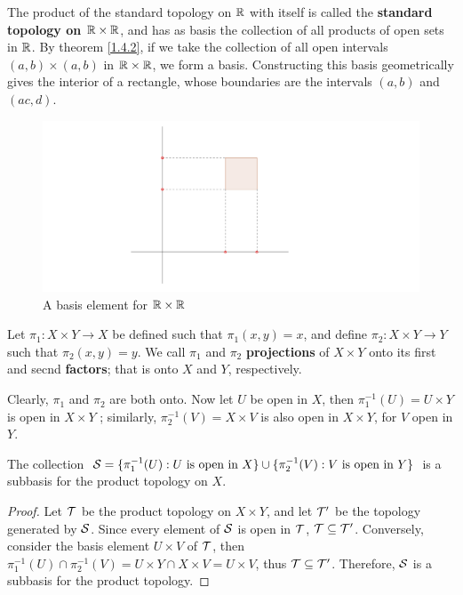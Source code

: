 \begin{example}
    The product of the standard topology on $\mathbb{R}$ with itself is called the \textbf{standard topology 
    on $\mathbb{R} \times \mathbb{R}$}, and has as basis the collection of all products of open sets in $\mathbb{R}$. 
    By theorem \ref{1.4.2}, if we take the collection of all open intervals $(a,b) \times (a,b)$ in 
    $\mathbb{R} \times \mathbb{R}$, we form a basis. Constructing this basis geometrically gives the interior of 
    a rectangle, whose boundaries are the intervals  $(a,b)$ and  $(ac,d)$.

    \begin{figure}[h]
        \centering
        \includegraphics[scale = 0.5]{Figures/Chapter1/interiorOfRectangle.png}
        \caption{A basis element for $\mathbb{R} \times \mathbb{R}$}
        \label{fig1.4}
    \end{figure}
\end{example} 

\begin{definition}
    Let $\pi_1:X \times Y \rightarrow X$ be defined such that  $\pi_1(x,y)=x$, and define $\pi_2:X \times Y \rightarrow Y$ 
    such that $\pi_2(x,y)=y$. We call $\pi_1$ and $\pi_2$ \textbf{projections} of $X \times Y$ onto 
    its  first and secnd \textbf{factors}; that is onto $X$ and $Y$, respectively.
\end{definition}

Clearly, $\pi_1$ and $\pi_2$ are both onto. Now let $U$ be open in  $X$, then 
$\pi_1^{-1}(U)=U \times Y$ is open in $X \times Y$ ; similarly, $\pi_2^{-1}(V)=X \times V$ is also open 
in $X \times Y$, for  $V$ open in  $Y$.

\begin{theorem}\label{1.4.3}
    The collection $\mathcal{S}=\{\pi_1^{-1}(U): U \text{ is open in } X\} \cup \{\pi_2^{-1}(V): V \text{ is open in } Y\}$ 
    is a subbasis for the product topology on $X$.
\end{theorem}
\begin{proof}
    Let $\mathcal{T}$ be the product topology on  $X \times Y$, and let  $\mathcal{T}'$ be the topology 
    generated by $\mathcal{S}$. Since every element of  $\mathcal{S}$ is open in  $\mathcal{T}$,  $\mathcal{T} \subseteq \mathcal{T}'$. Conversely, 
    consider the basis element  $U \times V$ of $\mathcal{T}$, then  $\pi_1^{-1}(U) \cap \pi_2^{-1}(V)=
    U \times Y \cap X \times V=U \times V$, thus $\mathcal{T} \subseteq \mathcal{T}'$. Therefore, $\mathcal{S}$ is a subbasis for the 
    product topology.
\end{proof}

